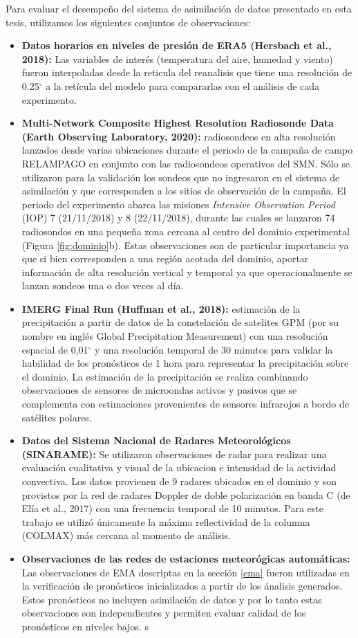 \documentclass[12pt,oneside]{reedthesis}
\begin{document}
Para evaluar el desempeño del sistema de asimilación de datos presentado en esta tesis, utilizamos los siguientes conjuntos de observaciones:
\begin{itemize}
\item
  \textbf{Datos horarios en niveles de presión de ERA5 (Hersbach et al., 2018):} Las variables de interés (temperatura del aire, humedad y viento) fueron interpoladas desde la reticula del reanalisis que tiene una resolución de 0.25\(^{\circ}\) a la retícula del modelo para compararlas con el análisis de cada experimento.
\item
  \textbf{Multi-Network Composite Highest Resolution Radiosonde Data (Earth Observing Laboratory, 2020):} radiosondeos en alta resolución lanzados desde varias ubicaciones durante el periodo de la campaña de campo RELAMPAGO en conjunto con las radiosondeos operativos del SMN. Sólo se utilizaron para la validación los sondeos que no ingresaron en el sistema de asimilación y que corresponden a los sitios de observación de la campaña. El periodo del experimento abarca las misiones \emph{Intensive Observation Period} (IOP) 7 (21/11/2018) y 8 (22/11/2018), durante las cuales se lanzaron 74 radiosondos en una pequeña zona cercana al centro del dominio experimental (Figura \ref{fig:dominio}b). Estas observaciones son de particular importancia ya que si bien corresponden a una región acotada del dominio, aportar información de alta resolución vertical y temporal ya que operacionalmente se lanzan sondeos una o dos veces al día.
\item
  \textbf{IMERG Final Run (Huffman et al., 2018):} estimación de la precipitación a partir de datos de la constelación de satelites GPM (por su nombre en inglés Global Precipitation Measurement) con una resolución espacial de 0,01\(^{\circ}\) y una resolución temporal de 30 minutos para validar la habilidad de los pronósticos de 1 hora para representar la precipitación sobre el dominio. La estimación de la precipitación se realiza combinando observaciones de sensores de microondas activos y pasivos que se complementa con estimaciones provenientes de sensores infrarojos a bordo de satélites polares.
\item
  \textbf{Datos del Sistema Nacional de Radares Meteorológicos (SINARAME):} Se utilizaron observaciones de radar para realizar una evaluación cualitativa y visual de la ubicacion e intensidad de la actividad convectiva. Los datos provienen de 9 radares ubicados en el dominio y son provistos por la red de radares Doppler de doble polarización en banda C (de Elía et al., 2017) con una frecuencia temporal de 10 minutos. Para este trabajo se utilizó únicamente la máxima reflectividad de la columna (COLMAX) más cercana al momento de análisis.
\item
  \textbf{Observaciones de las redes de estaciones meteorógicas automáticas:} Las observaciones de EMA descriptas en la sección \ref{ema} fueron utilizadas en la verificación de pronósticos inicializados a partir de los ánalisis generados. Estos pronósticos no incluyen asimilación de datos y por lo tanto estas observaciones son independientes y permiten evaluar calidad de los pronósticos en niveles bajos. s
\end{itemize}
\end{document}
